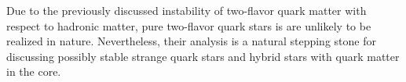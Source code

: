 Due to the previously discussed instability of two-flavor quark matter with respect to hadronic matter,
pure two-flavor quark stars is are unlikely to be realized in nature.
Nevertheless, their analysis is a natural stepping stone for discussing possibly stable strange quark stars and hybrid stars with quark matter in the core.



